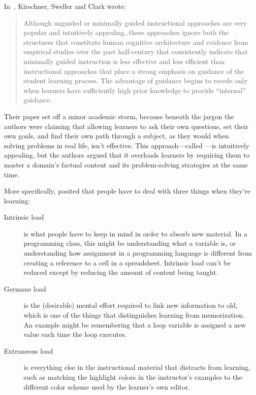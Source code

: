 
In~\cite{Kirs2006}, Kirschner, Sweller and Clark wrote:

\begin{quote}

Although unguided or minimally guided instructional approaches are
very popular and intuitively appealing{\ldots}these approaches
ignore both the structures that constitute human cognitive
architecture and evidence from empirical studies over the past
half-century that consistently indicate that minimally guided
instruction is less effective and less efficient than instructional
approaches that place a strong emphasis on guidance of the student
learning process. The advantage of guidance begins to recede only when
learners have sufficiently high prior knowledge to provide ``internal''
guidance.

\end{quote}

Their paper set off a minor academic storm, because beneath the jargon
the authors were claiming that allowing learners to ask their own
questions, set their own goals, and find their own path through a
subject, as they would when solving problems in real life, isn't
effective. This approach---called
---is
intuitively appealing, but the authors argued that it overloads learners
by requiring them to master a domain's factual content and its
problem-solving strategies at the same time.

More specifically, 
posited that people have to deal with three things when they're
learning:

\begin{description}
\item[Intrinsic load]
is what people have to keep in mind in order to absorb new material.
In a programming class, this might be understanding what a variable
is, or understanding how assignment in a programming language is
different from creating a reference to a cell in a spreadsheet.
Intrinsic load can't be reduced except by reducing the amount of
content being taught.
\item[Germane load]
is the (desirable) mental effort required to link new information to
old, which is one of the things that distinguishes learning from
memorization. An example might be remembering that a loop variable
is assigned a new value each time the loop executes.
\item[Extraneous load]
is everything else in the instructional material that distracts from
learning, such as matching the highlight colors in the instructor's
examples to the different color scheme used by the learner's own
editor.
\end{description}

